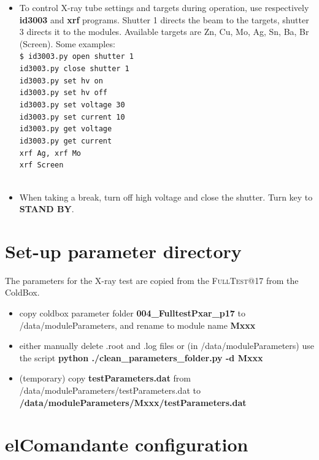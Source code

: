 \documentclass[fleqn,10pt]{SelfArx} %
\newcommand{\shellcmd}[1]{\\\indent\indent\texttt{\footnotesize\$ #1}\\}
\newcommand{\testname}[1]{{\color{Darkcyan} \textsc{#1}}}
\begin{document}
\begin{itemize}
\item {To control X-ray tube settings and targets during operation, use respectively \textbf{id3003} and \textbf{xrf} programs. Shutter 1 directs the beam to the targets, shutter 3 directs it to the modules. Available targets are Zn, Cu, Mo, Ag, Sn, Ba, Br (Screen). Some examples:
\shellcmd{
id3003.py open shutter 1\\
id3003.py close shutter 1\\
id3003.py set hv on\\
id3003.py set hv off\\
id3003.py set voltage 30\\
id3003.py set current 10\\
id3003.py get voltage\\
id3003.py get current\\
xrf Ag, xrf Mo\\
xrf Screen\\
}
}
\item{When taking a break, turn off high voltage and close the shutter. Turn key to \textbf{STAND BY}.}
\end{itemize}


\section{Set-up parameter directory}

The parameters for the X-ray test are copied from the \testname{FullTest}@17 from the ColdBox.

\begin{itemize}
\item copy coldbox parameter folder \textbf{004\_FulltestPxar\_p17} to /data/moduleParameters, and rename to module name \textbf{Mxxx}
\item either manually delete .root and .log files or (in /data/moduleParameters) use the script \textbf{python ./clean\_parameters\_folder.py -d Mxxx}
\item  (temporary) copy \textbf{testParameters.dat} from /data/moduleParameters/testParameters.dat to \textbf{/data/moduleParameters/Mxxx/testParameters.dat}
\end{itemize}

\section{elComandante configuration}
\end{document}
